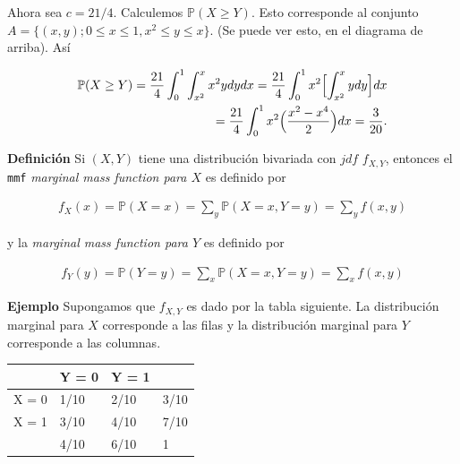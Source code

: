 \documentclass{article}\usepackage[]{graphicx}\usepackage[]{color}
\begin{document}
\newpage

Ahora sea $c = 21/4$. Calculemos $\mathbb{P}(X \geq Y)$. Esto corresponde al conjunto $A = \{ (x,y); 0 \leq x \leq 1, x^2 \leq y \leq x\}$. (Se puede ver esto, en el diagrama de arriba). As\'i


\begin{align*}
\mathbb{P}(X \geq Y) = \frac{21}{4}\int_{0}^{1}\int_{x^2}^{x}x^2ydydx = \frac{21}{4}\int_{0}^{1}x^2\Bigl[\int_{x^2}^{x}ydy\Bigr]dx\\\ = \frac{21}{4}\int_{0}^{1}x^2\Bigl( \frac{x^2 - x^4}{2}\Bigr)dx = \frac{3}{20}.
\end{align*}


\vspace{0.8cm}

\textbf{Definici\'on} Si $(X,Y)$ tiene una distribuci\'on bivariada con $jdf$ $f_{X,Y}$, entonces el \texttt{mmf} \textit{marginal mass function para $X$} es definido por

\begin{align}
f_{X}(x) = \mathbb{P}(X=x) = \sum_{y}\mathbb{P}(X = x, Y=y) = \sum_{y}f(x,y)
\end{align}


\vspace{0.2cm}

y la \textit{marginal mass function para $Y$} es definido por

\begin{align}
f_{Y}(y) = \mathbb{P}(Y=y) = \sum_{x}\mathbb{P}(X = x, Y=y) = \sum_{x}f(x,y)
\end{align}


\vspace{0.3cm}

\textbf{Ejemplo} Supongamos que $f_{X,Y}$ es dado por la tabla siguiente. La distribuci\'on marginal para $X$  corresponde a las filas y la distribuci\'on marginal para $Y$ corresponde  a las \mbox{columnas}.


\vspace{0.3cm}

\begin{table}[h]
\centering
\begin{tabular}{l|ll|l}
      & Y = 0 & Y = 1 &     \\
      \hline
X = 0 & 1/10   & 2/10   & 3/10 \\
X = 1 & 3/10   & 4/10   & 7/10 \\
\hline
      & 4/10   & 6/10   &  1  
\end{tabular}
\end{table}
\end{document}
